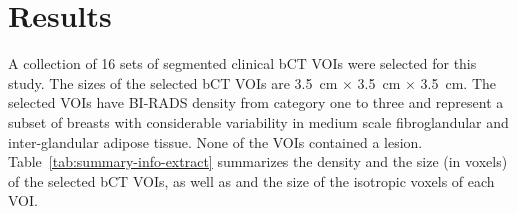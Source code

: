\documentclass[journal]{IEEEtran}
\begin{document}




\section{Results}
\label{sec:results}


A collection of 16 sets of segmented clinical bCT VOIs were selected
for this study. The sizes of the selected bCT VOIs are \SI{3.5}{\cm}
$\times$ \SI{3.5}{\cm} $\times$ \SI{3.5}{\cm}. The selected VOIs have
BI-RADS density from category one to three and represent a subset of
breasts with considerable variability in medium scale fibroglandular
and inter-glandular adipose tissue. None of the VOIs contained a
lesion. Table~\ref{tab:summary-info-extract} summarizes the density
and the size (in voxels) of the selected bCT VOIs, as well as and the
size of the isotropic voxels of each VOI.
\end{document}
